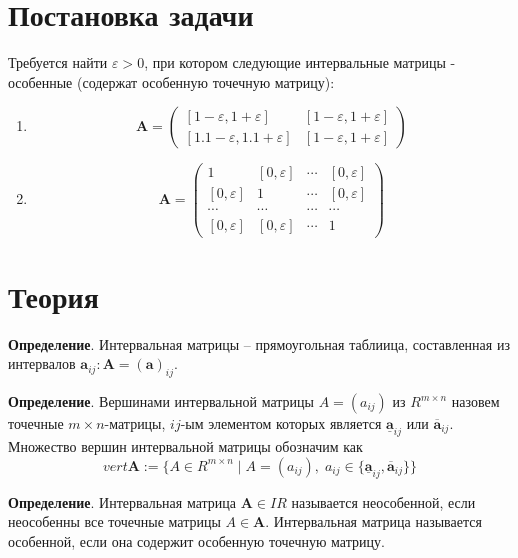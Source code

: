 \documentclass[14pt,a4paper,article]{ncc}
\begin{document}
\section{Постановка задачи}
Требуется найти $\varepsilon > 0$, при котором следующие интервальные
матрицы - особенные (содержат особенную точечную матрицу):
\begin{enumerate}
    \item 
    \begin{equation*}
    \textbf{A} = 
    \begin{pmatrix}
        [1 - \varepsilon, 1 + \varepsilon] & [1 - \varepsilon, 1 + \varepsilon] \\
        [1.1 - \varepsilon, 1.1 + \varepsilon] & [1 - \varepsilon, 1 + \varepsilon]
    \end{pmatrix}
    \end{equation*}
    
    \item 
    \begin{equation*}
    \textbf{A} = 
    \begin{pmatrix}
        1 & [0, \varepsilon] & \cdots & [0, \varepsilon] \\
        [0, \varepsilon] & 1 & \cdots & [0, \varepsilon] \\
        \cdots & \cdots & \cdots & \cdots \\
        [0, \varepsilon] & [0, \varepsilon] & \cdots & 1
    \end{pmatrix}
    \end{equation*}
\end{enumerate}

\section{Теория}
\textbf{Определение}. Интервальная матрицы -- прямоугольная таблиица, составленная из интервалов $\textbf{a}_{ij}: \textbf{A} = (\textbf{a})_{ij}$.


\textbf{Определение}. Вершинами интервальной матрицы $A = (a_{ij})$ из $R^{m\times n}$ назовем точечные $m \times n$-матрицы, $ij$-ым элементом которых
является $\underline{\textbf{a}}_{ij}$ или $\overline{\textbf{a}}_{ij}$. Множество вершин интервальной матрицы обозначим как 
$$ vert \textbf{A} := \{A \in R^{m \times n}\;|\; A = (a_{ij}),\; a_{ij} \in \{\underline{\textbf{a}}_{ij}, \overline{\textbf{a}}_{ij}\}\} $$


\textbf{Определение}. Интервальная матрица $\textbf{A} \in IR$ называется неособенной, если неособенны все точечные матрицы $A \in \textbf{A}$.
Интервальная матрица называется особенной, если она содержит особенную точечную матрицу.
\end{document}
